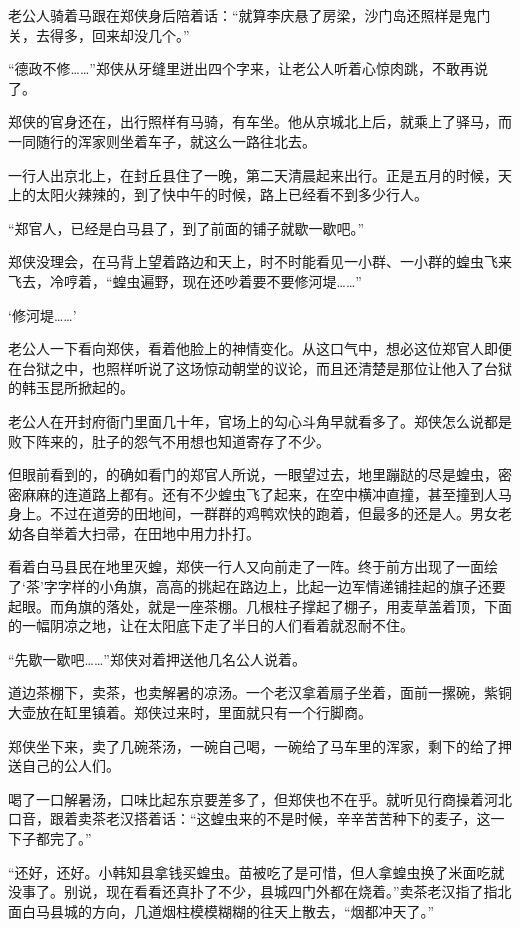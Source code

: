 老公人骑着马跟在郑侠身后陪着话：“就算李庆悬了房梁，沙门岛还照样是鬼门关，去得多，回来却没几个。”

“德政不修……”郑侠从牙缝里迸出四个字来，让老公人听着心惊肉跳，不敢再说了。

郑侠的官身还在，出行照样有马骑，有车坐。他从京城北上后，就乘上了驿马，而一同随行的浑家则坐着车子，就这么一路往北去。

一行人出京北上，在封丘县住了一晚，第二天清晨起来出行。正是五月的时候，天上的太阳火辣辣的，到了快中午的时候，路上已经看不到多少行人。

“郑官人，已经是白马县了，到了前面的铺子就歇一歇吧。”

郑侠没理会，在马背上望着路边和天上，时不时能看见一小群、一小群的蝗虫飞来飞去，冷哼着，“蝗虫遍野，现在还吵着要不要修河堤……”

‘修河堤……’

老公人一下看向郑侠，看着他脸上的神情变化。从这口气中，想必这位郑官人即便在台狱之中，也照样听说了这场惊动朝堂的议论，而且还清楚是那位让他入了台狱的韩玉昆所掀起的。

老公人在开封府衙门里面几十年，官场上的勾心斗角早就看多了。郑侠怎么说都是败下阵来的，肚子的怨气不用想也知道寄存了不少。

但眼前看到的，的确如看门的郑官人所说，一眼望过去，地里蹦跶的尽是蝗虫，密密麻麻的连道路上都有。还有不少蝗虫飞了起来，在空中横冲直撞，甚至撞到人马身上。不过在道旁的田地间，一群群的鸡鸭欢快的跑着，但最多的还是人。男女老幼各自举着大扫帚，在田地中用力扑打。

看着白马县民在地里灭蝗，郑侠一行人又向前走了一阵。终于前方出现了一面绘了‘茶’字字样的小角旗，高高的挑起在路边上，比起一边军情递铺挂起的旗子还要起眼。而角旗的落处，就是一座茶棚。几根柱子撑起了棚子，用麦草盖着顶，下面的一幅阴凉之地，让在太阳底下走了半日的人们看着就忍耐不住。

“先歇一歇吧……”郑侠对着押送他几名公人说着。

道边茶棚下，卖茶，也卖解暑的凉汤。一个老汉拿着扇子坐着，面前一摞碗，紫铜大壶放在缸里镇着。郑侠过来时，里面就只有一个行脚商。

郑侠坐下来，卖了几碗茶汤，一碗自己喝，一碗给了马车里的浑家，剩下的给了押送自己的公人们。

喝了一口解暑汤，口味比起东京要差多了，但郑侠也不在乎。就听见行商操着河北口音，跟着卖茶老汉搭着话：“这蝗虫来的不是时候，辛辛苦苦种下的麦子，这一下子都完了。”

“还好，还好。小韩知县拿钱买蝗虫。苗被吃了是可惜，但人拿蝗虫换了米面吃就没事了。别说，现在看看还真扑了不少，县城四门外都在烧着。”卖茶老汉指了指北面白马县城的方向，几道烟柱模模糊糊的往天上散去，“烟都冲天了。”

